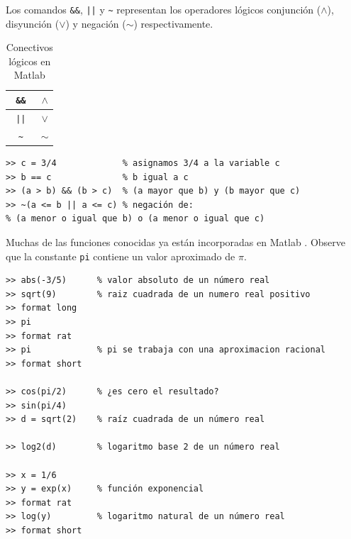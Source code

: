 \documentclass[letter,11pt]{article}
\newcommand\0{\mathbf{0}}
\newcommand{\matlab}{{\sc Matlab }}
\begin{document}
Los comandos \Verb+&&+, \Verb+||+ y \Verb+~+
	representan los operadores l\'ogicos conjunci\'on ($\wedge$),
	disyunci\'on ($\vee$) y negaci\'on ($\sim$) respectivamente.	

	
	\begin{table}[ht]
\begin{center}
		\begin{tabular}{|c|c|}\hline
			\Verb+ && + & $\wedge$\\\hline
			\Verb+ || + & $\vee$\\\hline
			\Verb+ ~ + & $\sim$\\\hline
		\end{tabular}
\end{center}
\caption{Conectivos l\'ogicos en \matlab}\label{table:logic}
\end{table}

\newpage
\begin{lstlisting}
>> c = 3/4             % asignamos 3/4 a la variable c
>> b == c              % b igual a c
>> (a > b) && (b > c)  % (a mayor que b) y (b mayor que c)
>> ~(a <= b || a <= c) % negación de:
% (a menor o igual que b) o (a menor o igual que c)
\end{lstlisting}

\medskip

Muchas de las funciones conocidas ya est\'an incorporadas en \matlab.
Observe que la cons\-tan\-te \Verb+pi+ contiene un valor aproximado de $\pi$.

\medskip

\begin{lstlisting}
>> abs(-3/5)      % valor absoluto de un número real
>> sqrt(9)        % raiz cuadrada de un numero real positivo
>> format long
>> pi
>> format rat
>> pi             % pi se trabaja con una aproximacion racional
>> format short

>> cos(pi/2)      % ¿es cero el resultado?
>> sin(pi/4)
>> d = sqrt(2)    % raíz cuadrada de un número real

>> log2(d)        % logaritmo base 2 de un número real	

>> x = 1/6
>> y = exp(x)     % función exponencial		
>> format rat
>> log(y)         % logaritmo natural de un número real
>> format short
\end{lstlisting}

\medskip
\end{document}
